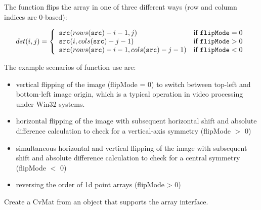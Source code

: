 
\begin{description}
\end{description}

The function flips the array in one of three different ways (row and column indices are 0-based):

\[
dst(i,j) = \left\{ \begin{array}{l l} \texttt{src}(rows(\texttt{src})-i-1,j) & \mbox{if $\texttt{flipMode} = 0$}\\ \texttt{src}(i,cols(\texttt{src})-j-1) & \mbox{if $\texttt{flipMode} > 0$}\\ \texttt{src}(rows(\texttt{src})-i-1,cols(\texttt{src})-j-1) & \mbox{if $\texttt{flipMode} < 0$}\\ \end{array} \right.
\]

The example scenarios of function use are:
\begin{itemize}
  \item vertical flipping of the image (flipMode = 0) to switch between top-left and bottom-left image origin, which is a typical operation in video processing under Win32 systems.
  \item horizontal flipping of the image with subsequent horizontal shift and absolute difference calculation to check for a vertical-axis symmetry (flipMode $>$ 0)
  \item simultaneous horizontal and vertical flipping of the image with subsequent shift and absolute difference calculation to check for a central symmetry (flipMode $<$ 0)
  \item reversing the order of 1d point arrays (flipMode > 0)
\end{itemize}

\ifPy


Create a CvMat from an object that supports the array interface.


\begin{description}
\end{description}

